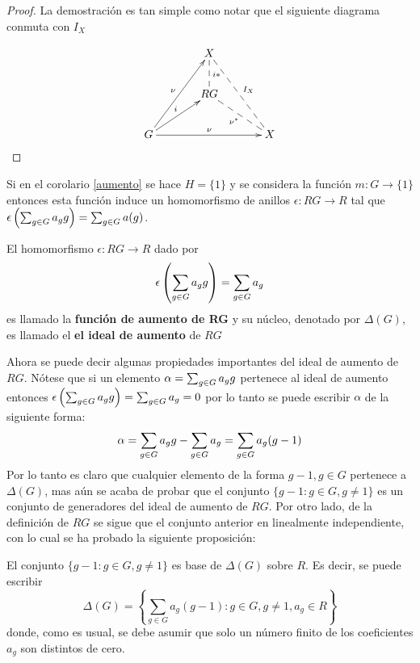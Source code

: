 \begin{proof}
La demostración es tan simple como notar que el siguiente diagrama conmuta con $I_X$

$$ \xymatrix @!0 @R=3pc @C=4.5pc { & X \ar@{--}[d]^{i*} \ar@{ --}^{I_X}[ddr] \\ & RG \ar@{--}_{\nu^*}[rd] & \\ G \ar[ruu]^{\nu} \ar[ru]^{i} \ar[rr]^{\nu}& & X}$$

\qedhere
\end{proof}

\begin{nota}
Si en el corolario \ref{aumento} se hace $H=\{1\}$ y se considera la función $m \colon G \to \{1\}$ entonces esta función induce un homomorfismo de anillos $\epsilon \colon RG \to R$ tal que $\epsilon\left(\sum_{g \in G} a_{g} g\right) = \sum_{g \in G} a(g)$. 
\end{nota}

\begin{definicion}
El homomorfismo $\epsilon \colon RG \to R$ dado por \[ \epsilon \left( \sum_{g \in G} a_{g} g\right) = \sum_{g \in G}a_g \] es llamado la \textbf{ función de aumento de RG} y su núcleo, denotado por $\Delta (G)$, es llamado el \textbf{el ideal de aumento} de $RG$
\end{definicion}


Ahora se puede decir algunas propiedades importantes del ideal de aumento de $RG$. Nótese que si un elemento $\alpha = \sum_{g \in G} a_{g} g$ pertenece al ideal de aumento entonces $ \epsilon \left( \sum_{g \in G} a_{g} g\right) = \sum_{g \in G}a_g = 0 $ por lo tanto se puede escribir $\alpha$ de la siguiente forma: 
\[\alpha = \sum_{g \in G} a_{g} g -\sum_{g \in G}a_g = \sum_{g \in G}a_g(g-1) \]
Por lo tanto es claro que cualquier elemento de la forma $g-1, g \in G$ pertenece a $\Delta(G)$, mas aún se acaba de probar que el conjunto $\{g-1 : g \in G, g \neq 1\}$ es un conjunto de generadores del ideal de aumento de $RG$. Por otro lado, de la definición de $RG$ se sigue que el conjunto anterior en linealmente independiente, con lo cual se ha probado la siguiente proposición:

\begin{proposicion} \label{gen}
El conjunto $\{ g-1 : g \in G , g \neq 1\}$ es base de $\Delta (G)$ sobre $R$. Es decir, se puede escribir
\begin{equation*}
\Delta (G) = \left\{ \sum_{g \in G} a_g(g-1) : g \in G , g \neq 1, a_g \in R \right\}
\end{equation*}
donde, como es usual, se debe asumir que solo un número finito de los coeficientes $a_g$ son distintos de cero.
\end{proposicion}


